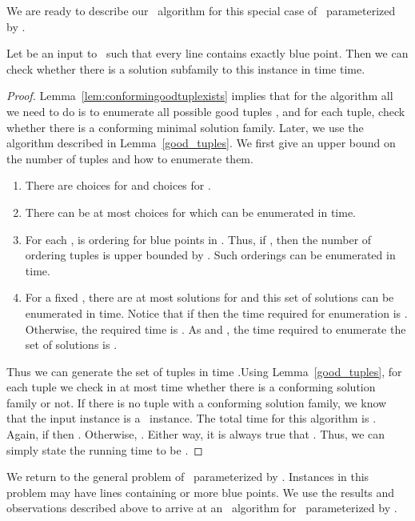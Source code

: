 We are ready to describe our \FPT\ algorithm for this special case of \slrbsc\ parameterized by .
\begin{lem}\label{solution_1blue}
Let   be an input to  \slrbsc\ such that every line contains exactly  blue point. Then we can check whether there is a solution subfamily  to this instance in time 
 time.
\end{lem}
\begin{proof}
Lemma~\ref{lem:conformingoodtuplexists} implies that for the algorithm all we need to do is to enumerate all possible good tuples 
, and for each tuple, check whether there 
is a conforming minimal solution family. Later, we use the algorithm described in Lemma~\ref{good_tuples}. 
We first give an upper bound on the number of tuples  and how to enumerate them. 
\begin{enumerate}
\item There are  choices for  and  choices for .
\item There can be at most  choices for  which can be enumerated in   time. 
\item For each ,  is ordering for blue points in . Thus, if , then the number of  ordering 
tuples  is upper bounded by . 
Such orderings can be enumerated in  time.
 
\item For a fixed , there are 
at most  solutions for   
and this set of solutions can be enumerated in  time. Notice that if  then the time required for enumeration is . Otherwise, the required time is . As  and , the time required to enumerate the set of solutions is . 
\end{enumerate}
   Thus we can generate the set of tuples in time .Using Lemma~\ref{good_tuples}, for each tuple we check in at most  time whether there is a conforming solution family or not. If there is no tuple with a conforming solution family, we know that the input instance is a \NO\ instance. 
   The total time for this algorithm is . Again, if  then . Otherwise, . Either way, it is always true that . Thus, we can simply state the running time to be 
   .  
\end{proof}








We return to the general problem of \slrbsc\ parameterized by . Instances in this problem may have lines containing  or more blue points. 
We use the results and observations described above to arrive at an \FPT\ algorithm for \slrbsc\ parameterized by .


